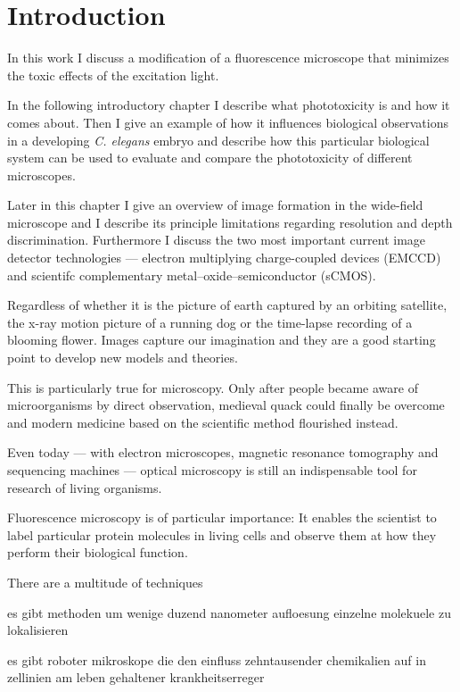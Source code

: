 \chapter{Introduction}
\label{sec:intro}
\begin{summary}
  In this work I discuss a modification of a fluorescence microscope    
  that minimizes the toxic effects of the excitation light.

  In the following introductory chapter I describe what phototoxicity   
  is and how it comes about. Then I give an example of how it
  influences biological observations in a developing \emph{C. elegans}
  embryo and describe how this particular biological system can be
  used to evaluate and compare the phototoxicity of different microscopes.

  Later in this chapter I give an overview of image formation   
  in the wide-field microscope and I describe its principle limitations
  regarding resolution and depth discrimination. Furthermore I
  discuss the two most important current image detector technologies
  --- electron multiplying charge-coupled devices (EMCCD) and
  scientifc complementary metal–oxide–semiconductor (sCMOS).
\end{summary}
Regardless of whether it is the picture of earth captured by an
orbiting satellite, the x-ray motion picture of a running dog or the
time-lapse recording of a blooming flower. Images capture our
imagination and they are a good starting point to develop new models
and theories.

This is particularly true for microscopy.  Only after people became
aware of microorganisms by direct observation, medieval quack could
finally be overcome and modern medicine based on the scientific
method flourished instead.

Even today --- with electron microscopes, magnetic resonance
tomography and sequencing machines --- optical microscopy is still an
indispensable tool for research of living organisms.

Fluorescence microscopy is of particular importance: It enables the
scientist to label particular protein molecules in living cells and
observe them at how they perform their biological function.

There are a multitude of techniques

es gibt methoden um wenige duzend nanometer aufloesung einzelne molekuele zu lokalisieren

es gibt roboter mikroskope die den einfluss zehntausender chemikalien auf in zellinien am leben gehaltener krankheitserreger


